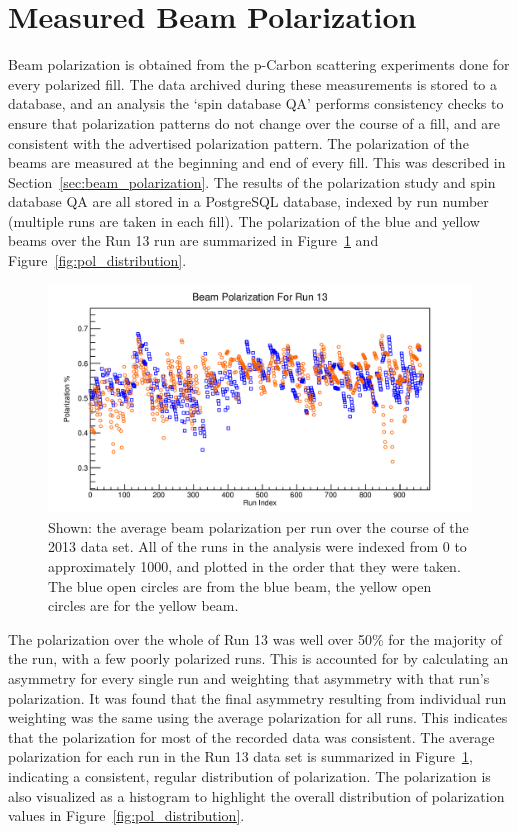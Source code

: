 \section{Measured Beam Polarization}
\label{sec:measured_beam_polarization}

Beam polarization is obtained from the p-Carbon scattering experiments done for
every polarized fill. The data archived during these measurements is stored to a
database, and an analysis the `spin database QA' performs consistency checks to
ensure that polarization patterns do not change over the course of a fill, and
are consistent with the advertised polarization pattern. The polarization of the
beams are measured at the beginning and end of every fill. This was described in
Section~\ref{sec:beam_polarization}. The results of the polarization study and
spin database QA are all stored in a PostgreSQL database, indexed by run number
(multiple runs are taken in each fill). The polarization of the blue and yellow
beams over the Run 13 run are summarized in Figure~\ref{fig:avg_polarization}
and Figure~\ref{fig:pol_distribution}.

\begin{figure}[ht]
  \centering
  \includegraphics[width=\linewidth]{./figures/beam_polarization.jpg}
  \caption{
    Shown: the average beam polarization per run over the course of the 2013
    data set. All of the runs in the analysis were indexed from 0 to
    approximately 1000, and plotted in the order that they were taken. The blue
    open circles are from the blue beam, the yellow open circles are for the
    yellow beam.
  }
  \label{fig:avg_polarization}
\end{figure}

The polarization over the whole of Run 13 was well over 50\% for the majority of
the run, with a few poorly polarized runs. This is accounted for by calculating
an asymmetry for every single run and weighting that asymmetry with that run's
polarization. It was found that the final asymmetry resulting from individual
run weighting was the same using the average polarization for all runs. This
indicates that the polarization for most of the recorded data was consistent.
The average polarization for each run in the Run 13 data set is summarized in
Figure~\ref{fig:avg_polarization}, indicating a consistent, regular distribution
of polarization. The polarization is also visualized as a histogram to highlight
the overall distribution of polarization values in
Figure~\ref{fig:pol_distribution}.

